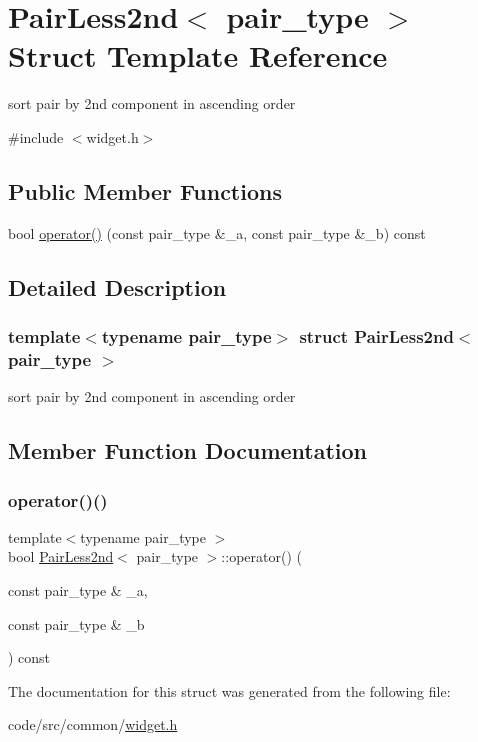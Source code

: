 \hypertarget{struct_pair_less2nd}{}\section{Pair\+Less2nd$<$ pair\+\_\+type $>$ Struct Template Reference}
\label{struct_pair_less2nd}


sort pair by 2nd component in ascending order  




{\ttfamily \#include $<$widget.\+h$>$}

\subsection*{Public Member Functions}
\begin{DoxyCompactItemize}
\item 
bool \hyperlink{struct_pair_less2nd_ab794f9af084ecf20527e87634b669f17}{operator()} (const pair\+\_\+type \&\+\_\+a, const pair\+\_\+type \&\+\_\+b) const
\end{DoxyCompactItemize}


\subsection{Detailed Description}
\subsubsection*{template$<$typename pair\+\_\+type$>$\newline
struct Pair\+Less2nd$<$ pair\+\_\+type $>$}

sort pair by 2nd component in ascending order 

\subsection{Member Function Documentation}
\mbox{\label{struct_pair_less2nd_ab794f9af084ecf20527e87634b669f17}} 
\subsubsection{\texorpdfstring{operator()()}{operator()()}}
{\footnotesize\ttfamily template$<$typename pair\+\_\+type $>$ \\
bool \hyperlink{struct_pair_less2nd}{Pair\+Less2nd}$<$ pair\+\_\+type $>$\+::operator() (\begin{DoxyParamCaption}\item[{const pair\+\_\+type \&}]{\+\_\+a,  }\item[{const pair\+\_\+type \&}]{\+\_\+b }\end{DoxyParamCaption}) const\hspace{0.3cm}{\ttfamily [inline]}}



The documentation for this struct was generated from the following file\+:\begin{DoxyCompactItemize}
\item 
code/src/common/\hyperlink{widget_8h}{widget.\+h}\end{DoxyCompactItemize}
